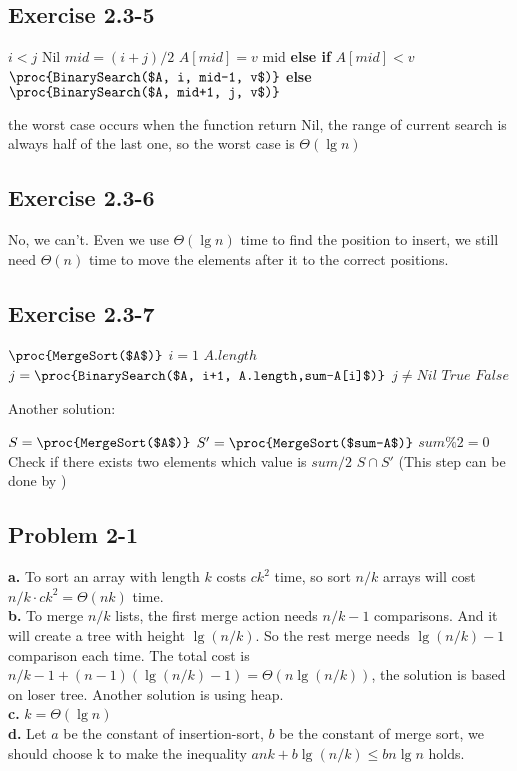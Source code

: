 \documentclass[12pt]{article}
\theoremstyle{definition}
\theoremstyle{remark}
\begin{document}
\subsection*{Exercise 2.3-5}
\begin{codebox}
\li \If $i<j$
\li \quad \Return Nil
\li $mid = (i+j)/2$
\li \If $A[mid]=v$ \label{li:if}
\li \quad \Return mid
\li \textbf{else if} $A[mid]<v$
\li \quad \Return $\proc{BinarySearch($A, i, mid-1, v$)}$
\li \textbf{else}
\li \quad \Return $\proc{BinarySearch($A, mid+1, j, v$)}$
\end{codebox}
the worst case occurs when the function return Nil, the range of current search is always half of the last one, so the worst case is $\Theta(\lg{n})$
\subsection*{Exercise 2.3-6}
No, we can't. Even we use $\Theta(\lg{n})$ time to find the position to insert, we still need $\Theta(n)$ time to move the elements after it to the correct positions.
\subsection*{Exercise 2.3-7}
\begin{codebox}
\li $\proc{MergeSort($A$)}$
\li \For $i = 1$ \To $A.length$ \label{li:for}
\li \quad $j=\proc{BinarySearch($A, i+1, A.length,sum-A[i]$)}$
\li \quad \If $j\ne Nil$
\li \qquad \Return $True$
\li \Return $False$
\end{codebox}
Another solution:
\begin{codebox}
\li $S=\proc{MergeSort($A$)}$
\li $S'=\proc{MergeSort($sum-A$)}$
\li \If $sum\%2=0$
\li \quad Check if there exists two elements which value is $sum/2$
\li \Return $S\cap S'$ (This step can be done by )
\end{codebox}
\subsection*{Problem 2-1}
\textbf{a.} To sort an array with length $k$ costs $ck^2$ time, so sort $n/k$ arrays will cost $n/k\cdot ck^2=\Theta(nk)$ time.\\
\textbf{b.} To merge $n/k$ lists, the first merge action needs $n/k-1$ comparisons. And it will create a tree with height $\lg(n/k)$. So the rest merge needs $\lg(n/k)-1$ comparison each time. The total cost is $n/k-1+(n-1)(\lg(n/k)-1)=\Theta(n\lg(n/k))$, the solution is based on loser tree. Another solution is using heap.\\
\textbf{c.} $k=\Theta(\lg{n})$\\
\textbf{d.} Let $a$ be the constant of insertion-sort, $b$ be the constant of merge sort, we should choose k to make the inequality $ank+b\lg(n/k)\le bn\lg n$ holds.
\end{document}

